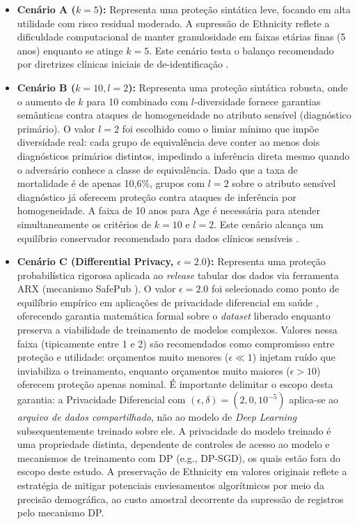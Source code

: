 \begin{itemize}
    \item \textbf{Cenário A ($k=5$):} Representa uma proteção sintática leve, focando em alta utilidade com risco residual moderado. A supressão de Ethnicity reflete a dificuldade computacional de manter granulosidade em faixas etárias finas (5 anos) enquanto se atinge $k=5$. Este cenário testa o balanço recomendado por diretrizes clínicas iniciais de de-identificação \cite{ElEmam2013}.
    
    \item \textbf{Cenário B ($k=10, l=2$):} Representa uma proteção sintática robusta, onde o aumento de $k$ para 10 combinado com $l$-diversidade fornece garantias semânticas contra ataques de homogeneidade no atributo sensível (diagnóstico primário). O valor $l=2$ foi escolhido como o limiar mínimo que impõe diversidade real: cada grupo de equivalência deve conter ao menos dois diagnósticos primários distintos, impedindo a inferência direta mesmo quando o adversário conhece a classe de equivalência. Dado que a taxa de mortalidade é de apenas 10,6\%, grupos com $l=2$ sobre o atributo sensível diagnóstico já oferecem proteção contra ataques de inferência por homogeneidade. A faixa de 10 anos para Age é necessária para atender simultaneamente os critérios de $k=10$ e $l=2$. Este cenário alcança um equilíbrio conservador recomendado para dados clínicos sensíveis \cite{Machanavajjhala2007}.
    
    \item \textbf{Cenário C (Differential Privacy, $\epsilon=2.0$):} Representa uma proteção probabilística rigorosa aplicada ao \textit{release} tabular dos dados via ferramenta ARX (mecanismo SafePub \cite{Prasser2014}). O valor $\epsilon=2.0$ foi selecionado como ponto de equilíbrio empírico em aplicações de privacidade diferencial em saúde \cite{Pilgram2024}, oferecendo garantia matemática formal sobre o \textit{dataset} liberado enquanto preserva a viabilidade de treinamento de modelos complexos. Valores nessa faixa (tipicamente entre 1 e 2) são recomendados como compromisso entre proteção e utilidade: orçamentos muito menores ($\epsilon \ll 1$) injetam ruído que inviabiliza o treinamento, enquanto orçamentos muito maiores ($\epsilon > 10$) oferecem proteção apenas nominal. É importante delimitar o escopo desta garantia: a Privacidade Diferencial com $(\epsilon, \delta)=(2{,}0, 10^{-5})$ aplica-se ao \textit{arquivo de dados compartilhado}, não ao modelo de \textit{Deep Learning} subsequentemente treinado sobre ele. A privacidade do modelo treinado é uma propriedade distinta, dependente de controles de acesso ao modelo e mecanismos de treinamento com DP (e.g., DP-SGD), os quais estão fora do escopo deste estudo. A preservação de Ethnicity em valores originais reflete a estratégia de mitigar potenciais enviesamentos algorítmicos por meio da precisão demográfica, ao custo amostral decorrente da supressão de registros pelo mecanismo DP.


\end{itemize}
